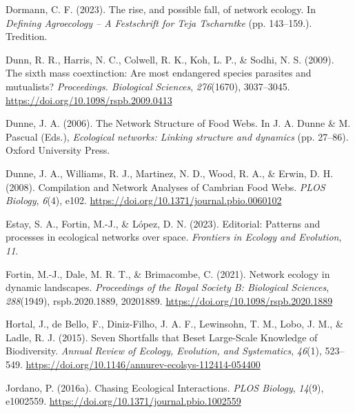 \documentclass[
]{article}
\newlength{\cslhangindent}
\newenvironment{CSLReferences}[2] %
 {\begin{list}{}{%
  \setlength{\itemindent}{0pt}
  \setlength{\leftmargin}{0pt}
  \setlength{\parsep}{0pt}
  \ifodd #1
   \setlength{\leftmargin}{\cslhangindent}
   \setlength{\itemindent}{-1\cslhangindent}
  \fi
  \setlength{\itemsep}{#2\baselineskip}}}
 {\end{list}}
\begin{document}
\begin{CSLReferences}{1}{0}
Dormann, C. F. (2023). The rise, and possible fall, of network ecology.
In \emph{Defining {Agroecology} -- {A Festschrift} for {Teja
Tscharntke}} (pp. 143--159.). Tredition.

Dunn, R. R., Harris, N. C., Colwell, R. K., Koh, L. P., \& Sodhi, N. S.
(2009). The sixth mass coextinction: Are most endangered species
parasites and mutualists? \emph{Proceedings. Biological Sciences},
\emph{276}(1670), 3037--3045.
\url{https://doi.org/10.1098/rspb.2009.0413}

Dunne, J. A. (2006). The {Network Structure} of {Food Webs}. In J. A.
Dunne \& M. Pascual (Eds.), \emph{Ecological networks: {Linking}
structure and dynamics} (pp. 27--86). Oxford University Press.

Dunne, J. A., Williams, R. J., Martinez, N. D., Wood, R. A., \& Erwin,
D. H. (2008). Compilation and {Network Analyses} of {Cambrian Food
Webs}. \emph{PLOS Biology}, \emph{6}(4), e102.
\url{https://doi.org/10.1371/journal.pbio.0060102}

Estay, S. A., Fortin, M.-J., \& López, D. N. (2023). Editorial:
{Patterns} and processes in ecological networks over space.
\emph{Frontiers in Ecology and Evolution}, \emph{11}.

Fortin, M.-J., Dale, M. R. T., \& Brimacombe, C. (2021). Network ecology
in dynamic landscapes. \emph{Proceedings of the Royal Society B:
Biological Sciences}, \emph{288}(1949), rspb.2020.1889, 20201889.
\url{https://doi.org/10.1098/rspb.2020.1889}

Hortal, J., de Bello, F., Diniz-Filho, J. A. F., Lewinsohn, T. M., Lobo,
J. M., \& Ladle, R. J. (2015). Seven {Shortfalls} that {Beset
Large-Scale Knowledge} of {Biodiversity}. \emph{Annual Review of
Ecology, Evolution, and Systematics}, \emph{46}(1), 523--549.
\url{https://doi.org/10.1146/annurev-ecolsys-112414-054400}

Jordano, P. (2016a). Chasing {Ecological Interactions}. \emph{PLOS
Biology}, \emph{14}(9), e1002559.
\url{https://doi.org/10.1371/journal.pbio.1002559}


\end{CSLReferences}
\end{document}
